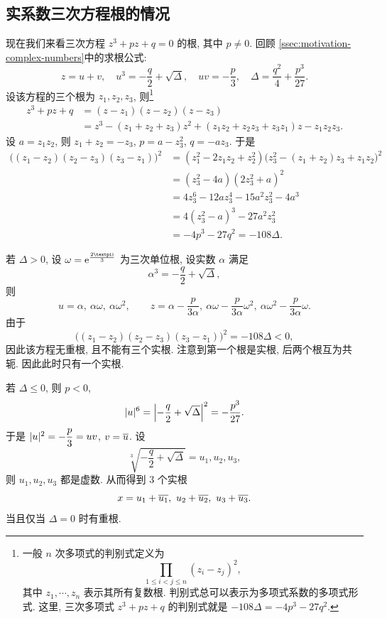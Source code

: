 \subsection{实系数三次方程根的情况\optional}
\label{ssec:real-cubic-equation}

现在我们来看三次方程 $z^3+pz+q=0$ 的根, 其中 $p\neq 0$.
回顾 \ref{ssec:motivation-complex-numbers}中的求根公式:
\[
  z=u+v,\quad 
  u^3=-\frac q2+\sqrt{\Delta},\quad 
  uv=-\frac p3,\quad 
  \Delta=\frac{q^2}4+\frac{p^3}{27}.
\]
设该方程的三个根为 $z_1,z_2,z_3$, 则\footnote{%
  一般 $n$ 次多项式的判别式定义为
  \[
    \prod_{1\le i<j\le n}(z_i-z_j)^2,
  \]
  其中 $z_1,\cdots,z_n$ 表示其所有复数根.
  判别式总可以表示为多项式系数的多项式形式.
  这里, 三次多项式 $z^3+pz+q$ 的判别式就是 $-108\Delta=-4p^3-27q^2$.
}
\begin{align*}
   z^3+pz+q&
  =(z-z_1)(z-z_2)(z-z_3)\\&
  =z^3-(z_1+z_2+z_3)z^2+(z_1z_2+z_2z_3+z_3z_1)z-z_1z_2z_3.
\end{align*}
设 $a=z_1z_2$, 则 $z_1+z_2=-z_3$, $p=a-z_3^2$, $q=-az_3$.
于是
\begin{align*}
   \bigl((z_1-z_2)(z_2-z_3)(z_3-z_1)\bigr)^2&
  =(z_1^2-2z_1z_2+z_2^2)\bigl(z_3^2-(z_1+z_2)z_3+z_1z_2\bigr)^2\\&
  =(z_3^2-4a)(2z_3^2+a)^2\\&
  =4z_3^6-12az_3^4-15a^2z_3^2-4a^3\\&
  =4(z_3^2-a)^3-27a^2z_3^2\\&
  =-4p^3-27q^2
  =-108\Delta.
\end{align*}

\begin{enuma}
  \item 若 $\Delta>0$, 设 $\omega=\ee^{\frac{2\cpi \ii}3}$ 为三次单位根, 设实数 $\alpha$ 满足
  \[\alpha^3=-\frac q2+\sqrt{\Delta},\]
  则
  \[
    u=\alpha,\ \alpha\omega,\ \alpha\omega^2,\qquad
    z=\alpha-\frac p{3\alpha},\ 
      \alpha\omega-\frac p{3\alpha} \omega^2,\ 
      \alpha\omega^2-\frac p{3\alpha} \omega.
  \]
  由于
  \[
      \bigl((z_1-z_2)(z_2-z_3)(z_3-z_1)\bigr)^2
    =-108\Delta<0,
  \]
  因此该方程无重根, 且不能有三个实根.
  注意到第一个根是实根, 后两个根互为共轭.
  因此此时只有一个实根.
  \item 若 $\Delta\le 0$, 则 $p<0$,
  \[
    \lvert u\rvert^6=\Bigl\vert-\frac q2+\sqrt\Delta\Bigr\vert^2=-\frac{p^3}{27}.
  \]
  于是 $\lvert u\rvert^2=-\dfrac p3=uv$, $v=\overline u$.
  设
  \[
    \sqrt[3]{-\frac q2+\sqrt{\Delta}}=u_1,u_2,u_3,
  \]
  则 $u_1,u_2,u_3$ 都是虚数. 从而得到 $3$ 个实根
  \[
    x=u_1+\ov{u_1},\ u_2+\ov{u_2},\ u_3+\ov{u_3}.
  \]
  当且仅当 $\Delta=0$ 时有重根.
\end{enuma}


